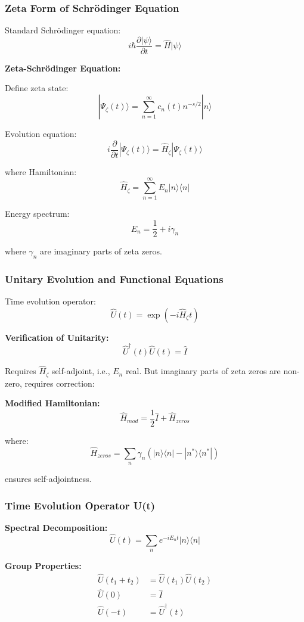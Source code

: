 \documentclass[11pt]{article}
\theoremstyle{plain}
\theoremstyle{definition}
\theoremstyle{remark}
\begin{document}
\subsubsection{Zeta Form of Schrödinger Equation}

Standard Schrödinger equation:
$$i\hbar \frac{\partial |\psi\rangle}{\partial t} = \hat{H} |\psi\rangle$$

\textbf{Zeta-Schrödinger Equation:}

Define zeta state:
$$|\Psi_\zeta(t)\rangle = \sum_{n=1}^{\infty} c_n(t) n^{-s/2} |n\rangle$$

Evolution equation:
$$i \frac{\partial}{\partial t} |\Psi_\zeta(t)\rangle = \hat{H}_\zeta |\Psi_\zeta(t)\rangle$$

where Hamiltonian:
$$\hat{H}_\zeta = \sum_{n=1}^{\infty} E_n |n\rangle\langle n|$$

Energy spectrum:
$$E_n = \frac{1}{2} + i\gamma_n$$

where $\gamma_n$ are imaginary parts of zeta zeros.

\subsubsection{Unitary Evolution and Functional Equations}

Time evolution operator:
$$\hat{U}(t) = \exp(-i\hat{H}_\zeta t)$$

\textbf{Verification of Unitarity:}
$$\hat{U}^\dagger(t) \hat{U}(t) = \hat{I}$$

Requires $\hat{H}_\zeta$ self-adjoint, i.e., $E_n$ real. But imaginary parts of zeta zeros are non-zero, requires correction:

\textbf{Modified Hamiltonian:}
$$\hat{H}_{mod} = \frac{1}{2}\hat{I} + \hat{H}_{zeros}$$

where:
$$\hat{H}_{zeros} = \sum_{n} \gamma_n (|n\rangle\langle n| - |n^*\rangle\langle n^*|)$$

ensures self-adjointness.

\subsubsection{Time Evolution Operator U(t)}

\textbf{Spectral Decomposition:}
$$\hat{U}(t) = \sum_{n} e^{-iE_n t} |n\rangle\langle n|$$

\textbf{Group Properties:}
\begin{align}
\hat{U}(t_1 + t_2) &= \hat{U}(t_1) \hat{U}(t_2) \\
\hat{U}(0) &= \hat{I} \\
\hat{U}(-t) &= \hat{U}^\dagger(t)
\end{align}
\end{document}
